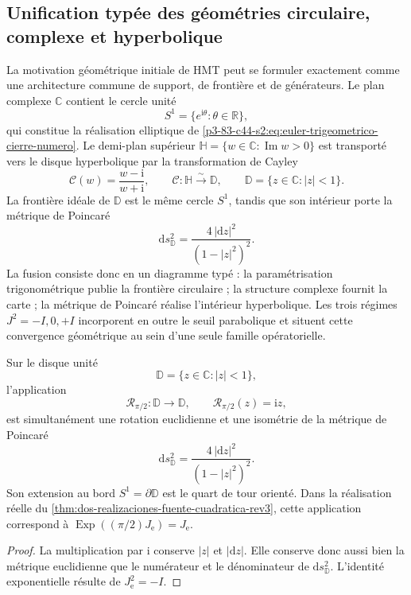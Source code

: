 \subsection{Unification typée des géométries circulaire, complexe et hyperbolique}
\label{p3-83-c44-s2:sec:unificacion-compleja-circular-hiperbolica-numero}

La motivation géométrique initiale de HMT peut se formuler exactement comme une
architecture commune de support, de frontière et de générateurs. Le plan complexe
\(\mathbb C\) contient le cercle unité
\[
 S^1=\{e^{\mathrm i\theta}:\theta\in\mathbb R\},
\]
qui constitue la réalisation elliptique de
\eqref{p3-83-c44-s2:eq:euler-trigeometrico-cierre-numero}. Le demi-plan supérieur
\(\mathbb H=\{w\in\mathbb C:\operatorname{Im}w>0\}\) est transporté vers le disque
hyperbolique par la transformation de Cayley
\[
 \mathcal C(w)=\frac{w-\mathrm i}{w+\mathrm i},
 \qquad
 \mathcal C:\mathbb H\xrightarrow{\sim}\mathbb D,
 \qquad
 \mathbb D=\{z\in\mathbb C:|z|<1\}.
\]
La frontière idéale de \(\mathbb D\) est le même cercle \(S^1\), tandis que son
intérieur porte la métrique de Poincaré
\[
 \mathrm ds_{\mathbb D}^2
 =\frac{4\,|\mathrm dz|^2}{(1-|z|^2)^2}.
\]
La fusion consiste donc en un diagramme typé : la paramétrisation
trigonométrique publie la frontière circulaire ; la structure complexe
fournit la carte ; la métrique de Poincaré réalise l'intérieur hyperbolique.
Les trois régimes \(J^2=-I,0,+I\) incorporent en outre le seuil parabolique et
situent cette convergence géométrique au sein d'une seule famille opératorielle.

\begin{proposition}
\label{p3-83-c44-s2:prop:cuarto-giro-poincare-rev3}
Sur le disque unité
\[
 \mathbb D=\{z\in\mathbb C:|z|<1\},
\]
l'application
\[
 \mathcal R_{\pi/2}:\mathbb D\longrightarrow\mathbb D,
 \qquad
 \mathcal R_{\pi/2}(z)=\mathrm i z,
\]
est simultanément une rotation euclidienne et une isométrie de la métrique de
Poincaré
\[
 \mathrm ds_{\mathbb D}^{2}
 =\frac{4\,|\mathrm dz|^2}{(1-|z|^2)^2}.
\]
Son extension au bord \(S^1=\partial\mathbb D\) est le quart de tour
orienté. Dans la réalisation réelle du
\cref{thm:dos-realizaciones-fuente-cuadratica-rev3}, cette application
correspond à
\(\operatorname{Exp}((\pi/2)J_{\mathrm e})=J_{\mathrm e}\).
\end{proposition}

\begin{proof}
La multiplication par \(\mathrm i\) conserve \(|z|\) et
\(|\mathrm dz|\). Elle conserve donc aussi bien la métrique euclidienne que le
numérateur et le dénominateur de \(\mathrm ds_{\mathbb D}^{2}\). L'identité
exponentielle résulte de \(J_{\mathrm e}^2=-I\).
\end{proof}

